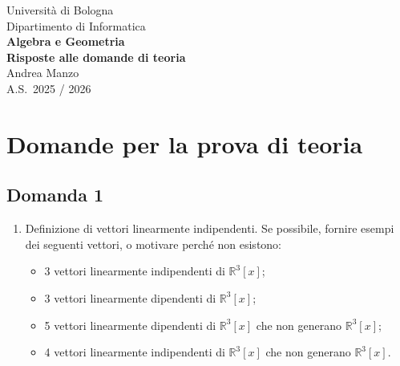 \documentclass[
  a4paper,
]{article}
\author{}
\date{}
\providecommand{\tightlist}{%
  \setlength{\itemsep}{0pt}\setlength{\parskip}{0pt}}
\providecommand{\tightlist}{}
\begin{document}
\begin{titlepage}
\thispagestyle{empty}
\begin{center}
{\large\textcolor[HTML]{555555}{Università di Bologna}}\\[0.5em]
{\normalsize\textcolor[HTML]{777777}{Dipartimento di Informatica}}\\[6em]

{\huge\bfseries Algebra e Geometria}\\[0.8em]
{\huge\bfseries Risposte alle domande di teoria}\\[6em]

{\Large Andrea Manzo}\\[1.2em]
{\large A.S.\ 2025 / 2026}\\[6em]
\end{center}
\end{titlepage}


{
\setcounter{tocdepth}{3}
\tableofcontents
}
\newpage

\hypertarget{domande-per-la-prova-di-teoria}{%
\section{Domande per la prova di
teoria}\label{domande-per-la-prova-di-teoria}}

\hypertarget{domanda-1}{%
\subsection{Domanda 1}\label{domanda-1}}

\begin{observationbox}[Domanda]
\begin{enumerate}
\def\labelenumi{\arabic{enumi}.}
\item
  Definizione di vettori linearmente indipendenti. Se possibile, fornire
  esempi dei seguenti vettori, o motivare perché non esistono:

  \begin{itemize}
  \tightlist
  \item
    3 vettori linearmente indipendenti di \(\mathbb{R}^3[x]\);
  \item
    3 vettori linearmente dipendenti di \(\mathbb{R}^3[x]\);
  \item
    5 vettori linearmente dipendenti di \(\mathbb{R}^3[x]\) che non
    generano \(\mathbb{R}^3[x]\);
  \item
    4 vettori linearmente indipendenti di \(\mathbb{R}^3[x]\) che non
    generano \(\mathbb{R}^3[x]\).
  \end{itemize}
\end{enumerate}
\end{observationbox}
\end{document}
